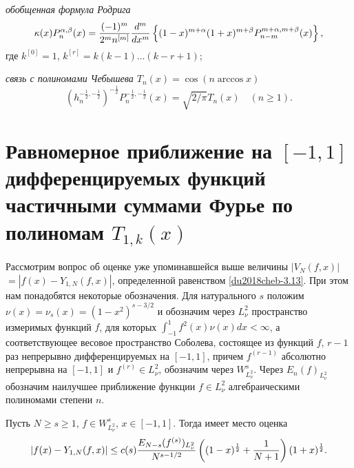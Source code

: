 \textit{обобщенная формула Родрига}
\begin{equation}\label{du2018cheb-4.4}
\kappa(x) P_n^{\alpha,\beta}(x)
={(-1)^m\over2^mn^{[m]}}{d^m\over dx^m}
\left\{(1-x)^{m+\alpha}(1+x)^{m+\beta} P_{n-m}^{m+\alpha,m+\beta}(x)
\right\},
\end{equation}
где $k^{[0]}=1$, $k^{[r]}=k(k-1)\dots(k-r+1)$;

\textit{связь с полиномами Чебышева $T_n(x)=\cos(n\arccos x)$}
\begin{equation}\label{du2018cheb-4.5}
\left(h_n^{-\frac12,-\frac12}\right)^{-\frac12}P_n^{-\frac{1}{2},-\frac{1}{2}}(x)
=\sqrt{2/\pi}T_n(x)\quad (n\ge1).
\end{equation}



\section{Равномерное приближение на $[-1,1]$ дифференцируемых функций частичными суммами Фурье по полиномам $T_{1,k}(x)$ }
Рассмотрим вопрос об оценке уже упоминавшейся выше величины $|V_N(f,x)|$ $=|f(x)- Y_{1,N}(f,x)|$, определенной равенством \eqref{du2018cheb-3.13}. При этом нам понадобятся некоторые обозначения. Для натурального $s$ положим $\nu(x)=\nu_s(x)=(1-x^2)^{s-3/2}$ и обозначим через $L_{\nu}^2$ пространство измеримых функций $f$, для которых $\int_{-1}^1f^2(x)\nu(x)dx<\infty$, а соответствующее весовое пространство Соболева,  состоящее из функций $f$, $r-1$ раз непрерывно дифференцируемых на $[-1,1]$, причем $f^{(r-1)}$ абсолютно непрерывна на $[-1,1]$  и $f^{(r)}\in L^2_{\nu}$, обозначим через $W^s_{L^2_{\nu}}$. Через $E_n(f)_{L^2_{\nu}}$  обозначим наилучшее приближение функции
$f\in L^2_{\nu}$ алгебраическими полиномами степени $n$.

\begin{theorem}\label{du2018cheb-th3}    Пусть $N\ge s\ge1$, $f\in W_{L^2_{\nu}}^s$, $x\in[-1,1]$. Тогда имеет  место оценка
	$$
	|f(x)- Y_{1,N}(f,x)|\le c(s) {E_{N-s}(f^{(s)})_{L^2_\nu}\over N^{s-1/2}}
	\left((1-x)^\frac12+\frac1{N+1}\right)(1+x)^\frac12.
	$$
\end{theorem}


